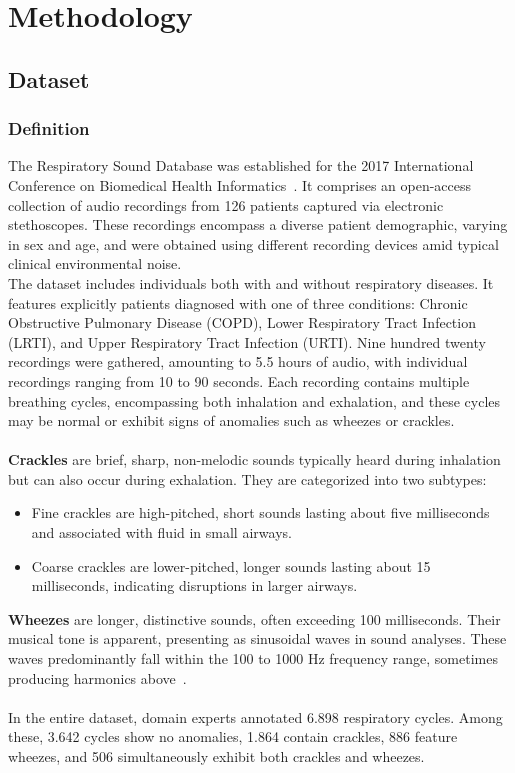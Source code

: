 \cleardoubleoddpage%
\chapter{Methodology}

\section{Dataset}
\subsection{Definition}
The Respiratory Sound Database was established for the 2017 International Conference on Biomedical Health Informatics~\cite{rocha2018alpha}. It comprises an open-access collection of audio recordings from 126 patients captured via electronic stethoscopes. These recordings encompass a diverse patient demographic, varying in sex and age, and were obtained using different recording devices amid typical clinical environmental noise.\\
The dataset includes individuals both with and without respiratory diseases. It features explicitly patients diagnosed with one of three conditions: Chronic Obstructive Pulmonary Disease (COPD), Lower Respiratory Tract Infection (LRTI), and Upper Respiratory Tract Infection (URTI). Nine hundred twenty recordings were gathered, amounting to 5.5 hours of audio, with individual recordings ranging from 10 to 90 seconds. Each recording contains multiple breathing cycles, encompassing both inhalation and exhalation, and these cycles may be normal or exhibit signs of anomalies such as wheezes or crackles.\\\\
\textbf{Crackles} are brief, sharp, non-melodic sounds typically heard during inhalation but can also occur during exhalation. They are categorized into two subtypes:
\begin{itemize}
    \item Fine crackles are high-pitched, short sounds lasting about five milliseconds and associated with fluid in small airways.
    \item Coarse crackles are lower-pitched, longer sounds lasting about 15 milliseconds, indicating disruptions in larger airways.
\end{itemize}

\textbf{Wheezes} are longer, distinctive sounds, often exceeding 100 milliseconds. Their musical tone is apparent, presenting as sinusoidal waves in sound analyses. These waves predominantly fall within the 100 to 1000 Hz frequency range, sometimes producing harmonics above~\cite{bohadana2014fundamentals}.\\\\
In the entire dataset, domain experts annotated 6.898 respiratory cycles. Among these, 3.642 cycles show no anomalies, 1.864 contain crackles, 886 feature wheezes, and 506 simultaneously exhibit both crackles and wheezes.

